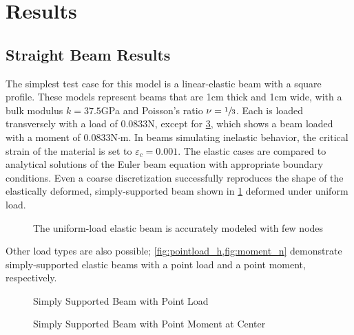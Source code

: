 \section{Results}
\label{sec:Results}
\FloatBarrier
\subsection{Straight Beam Results}
The simplest test case for this model is a linear-elastic beam with a square profile.
These models represent beams that are 1cm thick and 1cm wide, with a bulk modulus $k = 37.5$GPa and Poisson's ratio $\nu = \sfrac{1}{3}$.
Each is loaded transversely with a load of 0.0833N, except for \cref{fig:moment_n}, which shows a beam loaded with a moment of 0.0833N$\cdot$m.
In beams simulating inelastic behavior, the critical strain of the material is set to $\varepsilon_c = 0.001$.
The elastic cases are compared to analytical solutions of the Euler beam equation with appropriate boundary conditions.
Even a coarse discretization successfully reproduces the shape of the elastically deformed, simply-supported beam shown  in \cref{fig:elastic_g2000} deformed under uniform load.
%
\begin{figure}[htbp]
  \centering
  \resizebox{0.6\linewidth}{!}{}
  \caption{The uniform-load elastic beam is accurately modeled with few nodes}
  \label{fig:elastic_g2000}
\end{figure}
%
Other load types are also possible; \cref{fig:pointload_h,fig:moment_n} demonstrate simply-supported elastic beams with a point load and a point moment, respectively.
%
\begin{figure}[htbp]
  \centering
  \resizebox{0.6\linewidth}{!}{}
  \caption{Simply Supported Beam with Point Load}
  \label{fig:pointload_h}
\end{figure}
%
%
\begin{figure}[htbp]
  \centering
  \resizebox{0.6\linewidth}{!}{}
  \caption{Simply Supported Beam with Point Moment at Center}
  \label{fig:moment_n}
\end{figure}
%

